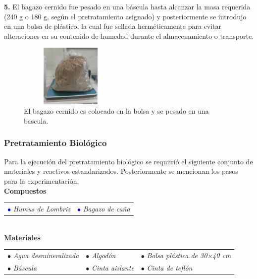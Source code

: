 \documentclass[12pt]{article}
\begin{document}
	
			\textbf{5.} El bagazo cernido fue pesado en una báscula hasta alcanzar la masa requerida (240 g o 180 g, según el pretratamiento asignado) y posteriormente se introdujo en una bolsa de plástico, la cual fue sellada herméticamente para evitar alteraciones en su contenido de humedad durante el almacenamiento o transporte.
			
			
			\begin{figure} [H]
				\centering
				\includegraphics[width=5cm, height=3cm]{imagenes/cernir_bagazo_pesado}
				\caption{El bagazo cernido es colocado en la bolsa y se pesado en una bascula.}
				\label{cernir_bagazo_pesado}
			\end{figure}
			
			
			
			
			\subsubsection{Pretratamiento Biológico}
	
			
		Para la ejecución del pretratamiento biológico se requiirió el siguiente conjunto de materiales y reactivos estandarizados. Posteriormente se mencionan los pasos para la experimentación.\\
			
			\textbf{Compuestos} \\[0.5em]
			

				\begin{tabular}{p{0.3\textwidth}p{}}
				\textcolor{blue}{$\bullet$} \textit{Humus de Lombriz}  &	\textcolor{blue}{$\bullet$} \textit{Bagazo de caña}
			\end{tabular} \\[0.5em]
			
			\textbf{Materiales} \\[0.5em] 
	
			\begin{tabular}{p{}p{}p{}}
				$\bullet$ \textit{Agua desmineralizada } & $\bullet$ \textit{Algodón} & $\bullet$ \textit{Bolsa plástica de 30×40 cm }\\
				$\bullet$ \textit{Báscula} & $\bullet$ \textit{Cinta aislante} & $\bullet$ \textit{Cinta de teflón}
			\end{tabular}
			\\[1em]
			
\end{document}
